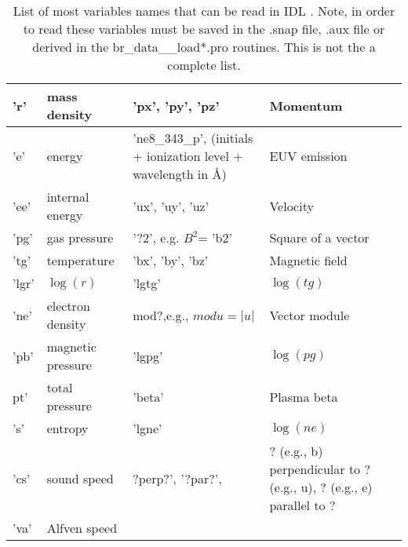 \documentclass[12pt,preprint]{aastex}
\begin{document}
\begin{table}[h!]
\caption{List of most variables names that can be read in IDL \label{tab:var}. Note, in order to read  
these variables must be saved in the .snap file, .aux file or derived in the br\_data\_\_load*.pro 
routines. This is not the a complete list.}
\begin{tabular}{p{0.8cm} |p{3.3cm} || p{4.5cm} | p{5.7cm} }
\hline
'r' & mass density & 'px', 'py', 'pz' & Momentum  \\
\hline
'e' & energy & 'ne8\_343\_p', (initials + ionization level + wavelength in \AA) & EUV emission \\ 
\hline
'ee' & internal energy & 'ux', 'uy', 'uz' & Velocity \\
\hline
'pg' & gas pressure & '?2', e.g. $B^2$= 'b2'  & Square of a vector \\
\hline
'tg' & temperature & 'bx', 'by', 'bz' & Magnetic field \\
\hline
'lgr' & $\log(r)$  & 'lgtg' & $\log(tg)$\\
\hline
'ne' & electron density  &  mod?,e.g., $modu=|u|$ & Vector module \\
\hline
'pb' & magnetic pressure & 'lgpg' & $\log (pg)$  \\
\hline
pt' & total pressure  & 'beta' & Plasma beta  \\
\hline
's' & entropy & 'lgne' & $\log(ne)$  \\
\hline
'cs' & sound speed & ?perp?', '?par?', & ? (e.g., b) perpendicular to ? (e.g., u), ? (e.g., e) parallel to ? \\
\hline
'va' & Alfven speed 
 \end{tabular}
\end{table}



\end{document}
